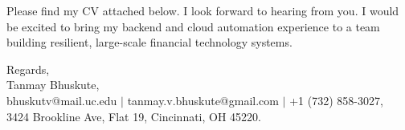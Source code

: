\documentclass[11pt]{letter}
\begin{document}
\begin{letter}{}
Please find my CV attached below. I look forward to hearing from you. I would be excited to bring my backend and cloud automation experience to a team building resilient, large-scale financial technology systems.

{\setlength{\parskip}{0pt}
Regards,\\
Tanmay Bhuskute,\\
bhuskutv@mail.uc.edu $\mid$ tanmay.v.bhuskute@gmail.com $\mid$ +1 (732) 858-3027,\\
3424 Brookline Ave, Flat 19, Cincinnati, OH 45220.
}

\end{letter}
\end{document}

